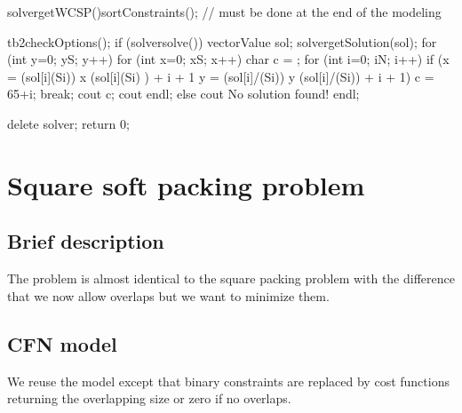 \documentclass[letterpaper,10pt,openany,oneside,english]{sphinxmanual}
\begin{document}
\begin{sphinxVerbatim}[commandchars=\\\{\}]
    solver\PYGZhy{}\PYGZgt{}getWCSP()\PYGZhy{}\PYGZgt{}sortConstraints(); // must be done at the end of the modeling

    tb2checkOptions();
    if (solver\PYGZhy{}\PYGZgt{}solve()) \PYGZob{}
            vector\PYGZlt{}Value\PYGZgt{} sol;
            solver\PYGZhy{}\PYGZgt{}getSolution(sol);
    	    for (int y=0; y\PYGZlt{}S; y++) \PYGZob{}
                for (int x=0; x\PYGZlt{}S; x++) \PYGZob{}
                    char c = \PYGZsq{} \PYGZsq{};
                    for (int i=0; i\PYGZlt{}N; i++) \PYGZob{}
                        if (x \PYGZgt{}= (sol[i]\PYGZpc{}(S\PYGZhy{}i)) \PYGZam{}\PYGZam{} x \PYGZlt{} (sol[i]\PYGZpc{}(S\PYGZhy{}i) ) + i + 1 \PYGZam{}\PYGZam{} y \PYGZgt{}= (sol[i]/(S\PYGZhy{}i)) \PYGZam{}\PYGZam{} y \PYGZlt{} (sol[i]/(S\PYGZhy{}i)) + i + 1) \PYGZob{}
                            c = 65+i;
                            break;
                        \PYGZcb{}
                     \PYGZcb{}
                     cout \PYGZlt{}\PYGZlt{} c;
                \PYGZcb{}
                cout \PYGZlt{}\PYGZlt{} endl;
            \PYGZcb{}
    \PYGZcb{} else \PYGZob{}
            cout \PYGZlt{}\PYGZlt{} \PYGZdq{}No solution found!\PYGZdq{} \PYGZlt{}\PYGZlt{} endl;
    \PYGZcb{}

    delete solver;
    return 0;
\PYGZcb{}

\end{sphinxVerbatim}

\sphinxstepscope


\section{Square soft packing problem}
\label{\detokenize{examples/tuto_sspp:square-soft-packing-problem}}\label{\detokenize{examples/tuto_sspp:tuto-sspp}}\label{\detokenize{examples/tuto_sspp::doc}}



\subsection{Brief description}
\label{\detokenize{examples/tuto_sspp:brief-description}}
\sphinxAtStartPar
The problem is almost identical to the square packing problem with the difference that we now allow overlaps but we want to minimize them.


\subsection{CFN model}
\label{\detokenize{examples/tuto_sspp:cfn-model}}
\sphinxAtStartPar
We reuse the {\hyperref[\detokenize{examples/tuto_spp:tuto-spp}]{}} model except that binary constraints are replaced by cost functions returning the overlapping size or zero if no overlaps.
\end{document}
